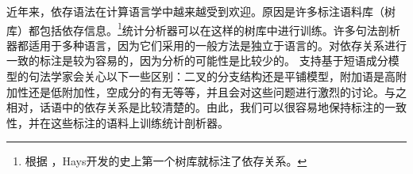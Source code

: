 %



近年来，依存语法在计算语言学中越来越受到欢迎。原因是许多标注语料库（树库）都包括依存信息。\footnote{%
根据 \citet{Kay2000a-u}，Hays开发的史上第一个树库就标注了依存关系。}统计分析器可以在这样的树库中进行训练\citep{YM2003a-u,Attardi2006a-u,Nivre2003a-u,KMcDN2009a-u,Bohnet2010a-u}。许多句法剖析器都适用于多种语言，因为它们采用的一般方法是独立于语言的。对依存关系进行一致的标注是较为容易的，因为分析的可能性是比较少的。
支持基于短语成分模型的句法学家会关心以下一些区别：二叉的分支结构还是平铺模型，附加语是高附加性还是低附加性，空成分的有无等等，并且会对这些问题进行激烈的讨论。与之相对，话语中的依存关系是比较清楚的。由此，我们可以很容易地保持标注的一致性，并在这些标注的语料上训练统计剖析器。

